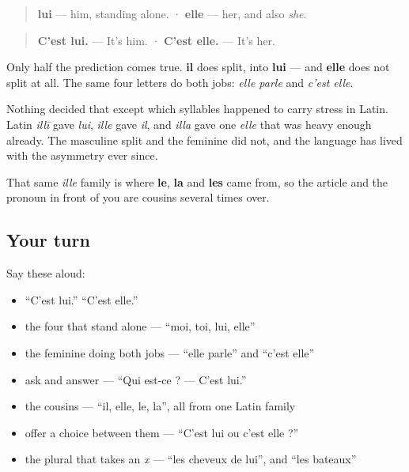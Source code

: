 \begin{cousinweb}
\begin{quote}
\textbf{lui} — him, standing alone. · \textbf{elle} — her, and also \emph{she}.
\end{quote}

\begin{quote}
\textbf{C'est lui.} — It's him. · \textbf{C'est elle.} — It's her.
\end{quote}

Only half the prediction comes true. \textbf{il} does split, into \textbf{lui} — and \textbf{elle} does not split at all. The same four letters do both jobs: \emph{elle parle} and \emph{c'est elle}.

Nothing decided that except which syllables happened to carry stress in Latin. Latin \emph{illī} gave \emph{lui}, \emph{ille} gave \emph{il}, and \emph{illa} gave one \emph{elle} that was heavy enough already. The masculine split and the feminine did not, and the language has lived with the asymmetry ever since.

That same \emph{ille} family is where \textbf{le}, \textbf{la} and \textbf{les} came from, so the article and the pronoun in front of you are cousins several times over.
\end{cousinweb}

\subsection*{Your turn}
Say these aloud:

\begin{itemize}
\raggedright
  \item \textquotedblleft{}C'est lui.\textquotedblright{} \textquotedblleft{}C'est elle.\textquotedblright{}
  \item the four that stand alone — \textquotedblleft{}moi, toi, lui, elle\textquotedblright{}
  \item the feminine doing both jobs — \textquotedblleft{}elle parle\textquotedblright{} and \textquotedblleft{}c'est elle\textquotedblright{}
  \item ask and answer — \textquotedblleft{}Qui est-ce ? — C'est lui.\textquotedblright{}
  \item the cousins — \textquotedblleft{}il, elle, le, la\textquotedblright{}, all from one Latin family
  \item offer a choice between them — \textquotedblleft{}C'est lui ou c'est elle ?\textquotedblright{}
  \item the plural that takes an \emph{x} — \textquotedblleft{}les cheveux de lui\textquotedblright{}, and \textquotedblleft{}les bateaux\textquotedblright{}
\end{itemize}

